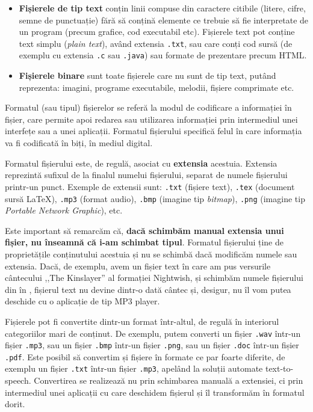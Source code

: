 \begin{itemize}
  \item \textbf{Fișierele de tip text} conțin linii compuse din caractere citibile (litere, cifre, semne de punctuație) fără să conțină elemente ce trebuie să fie interpretate de un program (precum grafice, cod executabil etc). Fișierele text pot conține text simplu (\textit{plain text}), având extensia \texttt{.txt}, sau care conți cod sursă (de exemplu cu extensia \texttt{.c} sau \texttt{.java}) sau formate de prezentare precum HTML.
  \item \textbf{Fișierele binare} sunt toate fișierele care nu sunt de tip text, putând reprezenta: imagini, programe executabile, melodii, fișiere comprimate etc.
\end{itemize}

Formatul (sau tipul) fișierelor se referă la modul de codificare a informației în fișier, care permite apoi redarea sau utilizarea informației prin intermediul unei interfețe sau a unei aplicații. Formatul fișierului specifică felul în care informația va fi codificată în biți, în mediul digital.

Formatul fișierului este, de regulă, asociat cu \textbf{extensia} acestuia. Extensia reprezintă sufixul de la finalul numelui fișierului, separat de numele fișierului printr-un punct. Exemple de extensii sunt: \texttt{.txt} (fișiere text), \texttt{.tex} (document sursă LaTeX), \texttt{.mp3} (format audio), \texttt{.bmp} (imagine tip \textit{bitmap}), \texttt{.png} (imagine tip \textit{Portable Network Graphic}), etc.

Este important să remarcăm că, \textbf{dacă schimbăm manual extensia unui fișier, nu înseamnă că i-am schimbat tipul}. Formatul fișierului ține de proprietățile conținutului acestuia și nu se schimbă dacă modificăm numele sau extensia. Dacă, de exemplu, avem un fișier text în care am pus versurile cântecului ,,The Kinslayer'' al formației Nightwish, și schimbăm numele fișierului din  în , fișierul text nu devine dintr-o dată cântec și, desigur, nu îl vom putea deschide cu o aplicație de tip MP3 player.

Fișierele pot fi convertite dintr-un format într-altul, de regulă în interiorul categoriilor mari de conținut. De exemplu, putem converti un fișier \texttt{.wav} într-un fișier \texttt {.mp3}, sau un fișier \texttt{.bmp} într-un fișier \texttt{.png}, sau un fișier \texttt{.doc} într-un fișier \texttt{.pdf}. Este posibil să convertim și fișiere în formate ce par foarte diferite, de exemplu un fișier \texttt{.txt} într-un fișier \texttt{.mp3}, apelând la soluții automate text-to-speech. Convertirea se realizează nu prin schimbarea manuală a extensiei, ci prin intermediul unei aplicații cu care deschidem fișierul și îl transformăm în formatul dorit.

